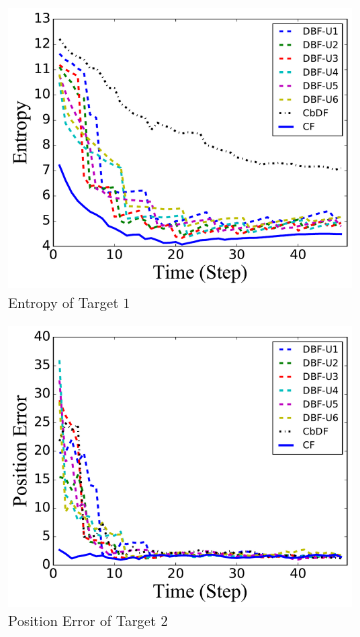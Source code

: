\begin{figure}
\begin{subfigure}[b]{0.23\textwidth}
			\includegraphics[width=\textwidth]{figures/hetero_mov_sen_mov_tar_entropy_noise_linear}
			\caption{Entropy of Target $1$}\label{fig:lin_ent}
		\end{subfigure}	
		\begin{subfigure}[b]{0.23\textwidth}
			\includegraphics[width=\textwidth]{figures/hetero_mov_sen_mov_tar_pos_err_noise_circle}
			\caption{Position Error of Target $2$}\label{fig:cir_pos_err}
		\end{subfigure}
		\begin{subfigure}[b]{0.23\textwidth}

\end{subfigure}
\end{figure}
